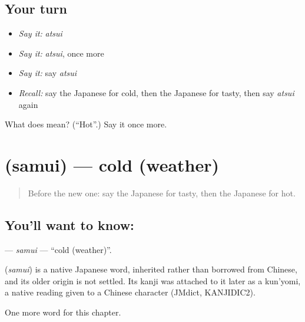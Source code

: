 \subsection*{Your turn}
\begin{itemize}
\raggedright
  \item \emph{Say it:} \emph{atsui}
  \item \emph{Say it:} \emph{atsui}, once more
  \item \emph{Say it:} say \emph{atsui}
  \item \emph{Recall:} say the Japanese for cold, then the Japanese for tasty, then say \emph{atsui} again
\end{itemize}

\begin{tcolorbox}[breakable,colback=teal!4,colframe=teal!35!black,title={Before you move on}]
What does  mean? (\textquotedblleft{}Hot\textquotedblright{}.) Say it once more.
\end{tcolorbox}
\section[\texorpdfstring{\ja{さむい} (samui)}{さむい (samui)}]{ (samui) — cold (weather)}

\label{lesson:JA-C53-samui}



\begin{quote}
Before the new one: say the Japanese for tasty, then the Japanese for hot.
\end{quote}

\subsection*{You'll want to know: }
\textbf{} — \emph{samui} — \textquotedblleft{}cold (weather)\textquotedblright{}.

\begin{cousinweb}
\textbf{} (\emph{samui}) is a native Japanese word, inherited rather than borrowed from Chinese, and its older origin is not settled. Its kanji was attached to it later as a kun'yomi, a native reading given to a Chinese character (JMdict, KANJIDIC2).
\end{cousinweb}

\begin{grammarlens}[title={What you've built}]
One more word for this chapter.
\end{grammarlens}


